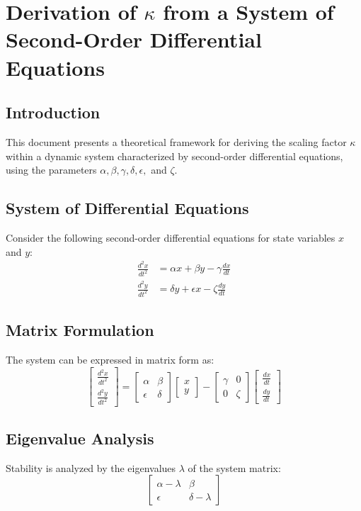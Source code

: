 \documentclass{article}
\begin{document}
\section{Derivation of \( \kappa \) from a System of Second-Order Differential Equations}

\subsection{Introduction}
This document presents a theoretical framework for deriving the scaling factor \( \kappa \) within a dynamic system characterized by second-order differential equations, using the parameters \( \alpha, \beta, \gamma, \delta, \epsilon, \) and \( \zeta \).

\subsection{System of Differential Equations}
Consider the following second-order differential equations for state variables \( x \) and \( y \):
\begin{align}
\frac{d^2x}{dt^2} &= \alpha x + \beta y - \gamma \frac{dx}{dt} \\
\frac{d^2y}{dt^2} &= \delta y + \epsilon x - \zeta \frac{dy}{dt}
\end{align}

\subsection{Matrix Formulation}
The system can be expressed in matrix form as:
\[
\begin{bmatrix}
\frac{d^2x}{dt^2} \\
\frac{d^2y}{dt^2}
\end{bmatrix}
=
\begin{bmatrix}
\alpha & \beta \\
\epsilon & \delta
\end{bmatrix}
\begin{bmatrix}
x \\
y
\end{bmatrix}
-
\begin{bmatrix}
\gamma & 0 \\
0 & \zeta
\end{bmatrix}
\begin{bmatrix}
\frac{dx}{dt} \\
\frac{dy}{dt}
\end{bmatrix}
\]

\subsection{Eigenvalue Analysis}
Stability is analyzed by the eigenvalues \( \lambda \) of the system matrix:
\[
\begin{bmatrix}
\alpha - \lambda & \beta \\
\epsilon & \delta - \lambda
\end{bmatrix}
\]
\end{document}
